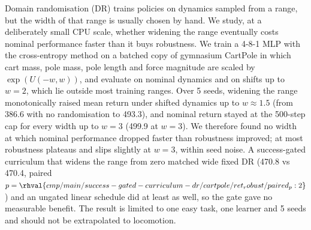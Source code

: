 Domain randomisation (DR) trains policies on dynamics sampled from a range, but the width of that range is usually chosen by hand. We study, at a deliberately small CPU scale, whether widening the range eventually costs nominal performance faster than it buys robustness. We train a 4-8-1 MLP with the cross-entropy method on a batched copy of gymnasium CartPole in which cart mass, pole mass, pole length and force magnitude are scaled by $\exp(U(-w,w))$, and evaluate on nominal dynamics and on shifts up to $w=2$, which lie outside most training ranges. Over 5 seeds, widening the range monotonically raised mean return under shifted dynamics up to $w\approx1.5$ (from 386.6 with no randomisation to 493.3), and nominal return stayed at the 500-step cap for every width up to $w=3$ (499.9 at $w=3$). We therefore found no width at which nominal performance dropped faster than robustness improved; at most robustness plateaus and slips slightly at $w=3$, within seed noise. A success-gated curriculum that widens the range from zero matched wide fixed DR (470.8 vs 470.4, paired $p=\rhval{cmp/main/success-gated-curriculum-dr/cartpole/ret_robust/paired_p:2}$) and an ungated linear schedule did at least as well, so the gate gave no measurable benefit. The result is limited to one easy task, one learner and 5 seeds and should not be extrapolated to locomotion.
